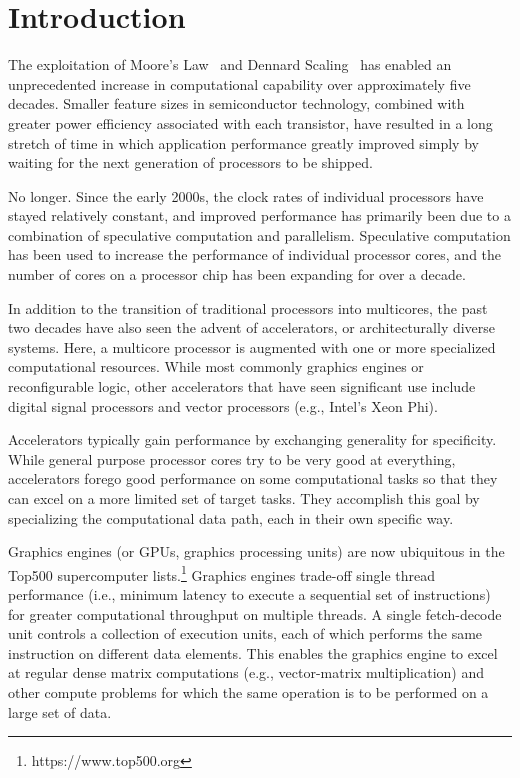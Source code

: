 \section{Introduction}
\label{sec:intro}

The exploitation of Moore's Law~\cite{Moore65,Mack11}
and Dennard Scaling~\cite{Dennard74,Bohr07}
has enabled an unprecedented increase in computational capability over 
approximately five decades. Smaller feature sizes in semiconductor
technology, combined with greater power efficiency associated with each
transistor, have resulted in a long stretch of time in which application
performance greatly improved simply by waiting for the next generation
of processors to be shipped.

No longer. Since the early 2000s, the clock rates of individual processors
have stayed relatively constant, and improved performance has primarily
been due to a combination of speculative computation and parallelism.
Speculative computation has been used to increase the performance of
individual processor cores, and the number of cores on a processor chip
has been expanding for over a decade.

In addition to the transition of traditional processors into multicores,
the past two decades have also seen the advent of accelerators, or
architecturally diverse systems.  Here, a multicore processor is augmented
with one or more specialized computational resources.  While most
commonly graphics engines or reconfigurable logic, other accelerators
that have seen significant use include digital signal processors
and vector processors (e.g., Intel's Xeon Phi).

Accelerators typically gain performance by exchanging generality for
specificity. While general purpose processor cores try to be very good
at everything, accelerators forego good performance on some computational
tasks so that they can excel on a more limited set of target tasks.
They accomplish this goal by specializing the computational data path,
each in their own specific way.

Graphics engines (or GPUs, graphics processing units) are now ubiquitous
in the Top500 supercomputer lists.\footnote{https://www.top500.org}
Graphics engines trade-off single thread performance (i.e., minimum latency
to execute a sequential set of instructions) for greater computational
throughput on multiple threads.  A single fetch-decode unit controls a
collection of execution units, each of which performs the same instruction
on different data elements.  This enables the graphics engine to excel
at regular dense matrix computations (e.g., vector-matrix multiplication)
and other compute problems for which the same operation is to be performed
on a large set of data.

